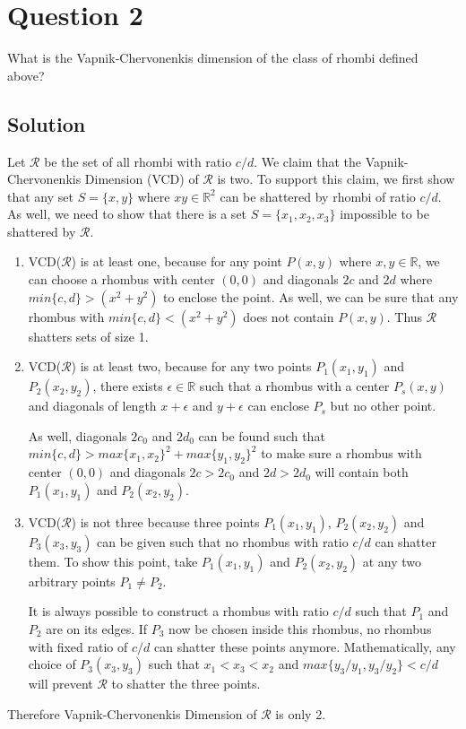 \section*{Question 2}

What is the Vapnik-Chervonenkis dimension of the class of rhombi defined above?

\subsection*{Solution}

Let $\mathcal{R}$ be the set of all rhombi with ratio $c/d$.
We claim that the Vapnik-Chervonenkis Dimension  (VCD) of $\mathcal{R}$ is two.
To support this claim, we first show that any set $ S = \{x, y\}$ where $x y \in \mathbb{R}^2$ can be shattered by rhombi of ratio $c/d$.
As well, we need to show that there is a set $S = \{x_1, x_2, x_3\}$ impossible to be shattered by $\mathcal{R}$.

\begin{enumerate}
\item VCD($\mathcal{R}$) is at least one, because for any point $P(x,y)$ where $x, y \in \mathbb{R}$, we can choose a rhombus with center $(0,0)$ and diagonals $2c$ and $2d$ where $min\{c,d\} > (x^2 + y^2)$ to enclose the point. As well, we can be sure that any rhombus with $min\{c,d\} < (x^2 + y^2)$ does not contain $P(x,y)$. Thus $\mathcal{R}$ shatters sets of size 1.

\item VCD($\mathcal{R}$) is at least two, because for any two points $P_1(x_1,y_1)$ and $P_2(x_2,y_2)$, there exists $\epsilon \in \mathbb{R}$ such that a rhombus with a center $P_s(x,y)$ and diagonals of length $x+\epsilon$ and $y+\epsilon$ can enclose $P_s$ but no other point.

As well, diagonals $2c_0$ and $2d_0$ can be found such that $min\{c,d\} > max\{x_1,x_2\}^2 + max\{y_1, y_2\}^2$ to make sure a rhombus with center $(0,0)$ and diagonals $2c > 2c_0$ and $2d > 2d_0$ will contain both $P_1(x_1,y_1)$ and $P_2(x_2,y_2)$.

\item VCD($\mathcal{R}$) is not three because three points $P_1(x_1,y_1)$, $P_2(x_2,y_2)$ and $P_3(x_3,y_3)$ can be given such that no rhombus with ratio $c/d$ can shatter them.
To show this point, take $P_1(x_1,y_1)$ and $P_2(x_2,y_2)$ at any two arbitrary points $P_1 \neq P_2$.

It is always possible to construct a rhombus with ratio $c/d$ such that $P_1$ and $P_2$ are on its edges. If $P_3$ now be chosen inside this rhombus, no rhombus with fixed ratio of $c/d$ can shatter these points anymore. Mathematically, any choice of $P_3(x_3,y_3)$ such that $x_1 < x_3 < x_2$ and $max\{y_3/y_1, y_3/y_2\} < c/d$ will prevent $\mathcal{R}$ to shatter the three points. 
\end{enumerate}

Therefore Vapnik-Chervonenkis Dimension of $\mathcal{R}$ is only 2.

